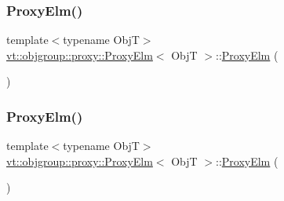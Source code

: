 \mbox{\label{structvt_1_1objgroup_1_1proxy_1_1_proxy_elm_a50590ebf12e4ae89fc140583412d05b0}} 
\subsubsection{\texorpdfstring{Proxy\+Elm()}{ProxyElm()}\hspace{0.1cm}{\footnotesize\ttfamily [2/4]}}
{\footnotesize\ttfamily template$<$typename ObjT$>$ \\
\hyperlink{structvt_1_1objgroup_1_1proxy_1_1_proxy_elm}{vt\+::objgroup\+::proxy\+::\+Proxy\+Elm}$<$ ObjT $>$\+::\hyperlink{structvt_1_1objgroup_1_1proxy_1_1_proxy_elm}{Proxy\+Elm} (\begin{DoxyParamCaption}\item[{\hyperlink{structvt_1_1objgroup_1_1proxy_1_1_proxy_elm}{Proxy\+Elm}$<$ ObjT $>$ const \&}]{ }\end{DoxyParamCaption})\hspace{0.3cm}{\ttfamily [default]}}

\mbox{\label{structvt_1_1objgroup_1_1proxy_1_1_proxy_elm_aa3feddfc8142ae38f9436ce3ff86efb7}} 
\subsubsection{\texorpdfstring{Proxy\+Elm()}{ProxyElm()}\hspace{0.1cm}{\footnotesize\ttfamily [3/4]}}
{\footnotesize\ttfamily template$<$typename ObjT$>$ \\
\hyperlink{structvt_1_1objgroup_1_1proxy_1_1_proxy_elm}{vt\+::objgroup\+::proxy\+::\+Proxy\+Elm}$<$ ObjT $>$\+::\hyperlink{structvt_1_1objgroup_1_1proxy_1_1_proxy_elm}{Proxy\+Elm} (\begin{DoxyParamCaption}\item[{\hyperlink{structvt_1_1objgroup_1_1proxy_1_1_proxy_elm}{Proxy\+Elm}$<$ ObjT $>$ \&\&}]{ }\end{DoxyParamCaption})\hspace{0.3cm}{\ttfamily [default]}}

